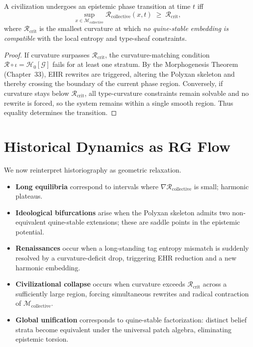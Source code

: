 \begin{theorem}
A civilization undergoes an epistemic phase transition at time $t$ iff
\[
\sup_{x\in\mathcal{M}_{\mathrm{collective}}}
\mathcal{R}_{\mathrm{collective}}(x,t)
\;\ge\;
\mathcal{R}_{\mathrm{crit}},
\]
where $\mathcal{R}_{\mathrm{crit}}$ is the smallest curvature at which
\emph{no quine-stable embedding is compatible} with the local entropy
and type-sheaf constraints.
\end{theorem}

\begin{proof}
If curvature surpasses $\mathcal{R}_{\mathrm{crit}}$, the curvature-matching
condition $\mathcal{R}\circ\iota=\mathcal{H}_0[\mathcal{G}]$ fails for at
least one stratum.  
By the Morphogenesis Theorem (Chapter~33), EHR rewrites are triggered,
altering the Polyxan skeleton and thereby crossing the boundary of the
current phase region.  
Conversely, if curvature stays below $\mathcal{R}_{\mathrm{crit}}$, all
type-curvature constraints remain solvable and no rewrite is forced,
so the system remains within a single smooth region.  
Thus equality determines the transition.
\end{proof}

\section{Historical Dynamics as RG Flow}

We now reinterpret historiography as geometric relaxation.

\begin{itemize}
\item \textbf{Long equilibria}  
      correspond to intervals where $\nabla\mathcal{R}_{\mathrm{collective}}$
      is small; harmonic plateaus.

\item \textbf{Ideological bifurcations}  
      arise when the Polyxan skeleton admits two non-equivalent
      quine-stable extensions; these are saddle points in the epistemic
      potential.

\item \textbf{Renaissances}  
      occur when a long-standing tag entropy mismatch is suddenly resolved by
      a curvature-deficit drop, triggering EHR reduction and a new harmonic
      embedding.

\item \textbf{Civilizational collapse}  
      occurs when curvature exceeds $\mathcal{R}_{\mathrm{crit}}$ across a
      sufficiently large region, forcing simultaneous rewrites and radical
      contraction of $\mathcal{M}_{\mathrm{collective}}$.

\item \textbf{Global unification}  
      corresponds to quine-stable factorization: distinct belief strata
      become equivalent under the universal patch algebra, eliminating
      epistemic torsion.
\end{itemize}

